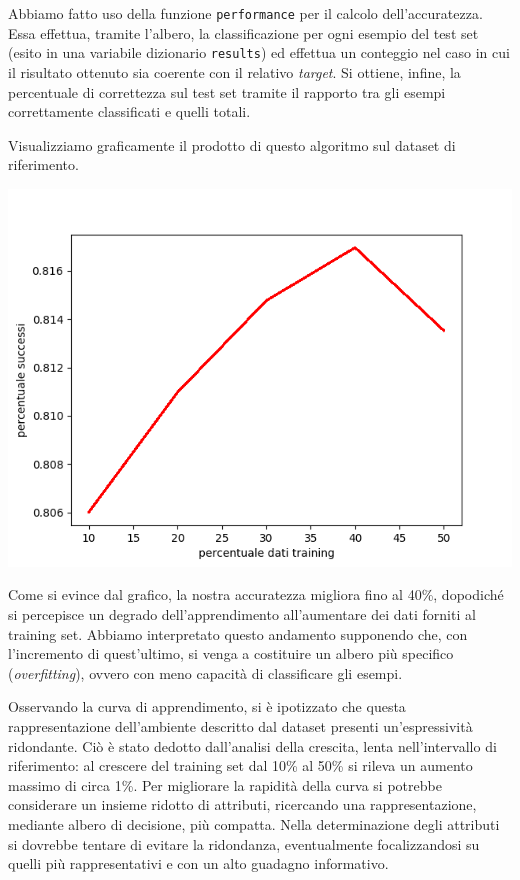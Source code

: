 			Abbiamo fatto uso della funzione \texttt{performance} per il calcolo dell'accuratezza. Essa effettua, tramite l'albero, la classificazione per ogni esempio del test set (esito in una variabile dizionario \texttt{results}) ed effettua un conteggio nel caso in cui il risultato ottenuto sia coerente con il relativo \emph{target}. Si ottiene, infine, la percentuale di correttezza sul test set tramite il rapporto tra gli esempi correttamente classificati e quelli totali.\par
			Visualizziamo graficamente il prodotto di questo algoritmo sul dataset di riferimento.
			
			\includegraphics[scale=0.86]{performance.png}
			 
			Come si evince dal grafico, la nostra accuratezza migliora fino al 40\%, dopodiché si percepisce un degrado dell'apprendimento all'aumentare dei dati forniti al training set. Abbiamo interpretato questo andamento supponendo che, con l'incremento di quest'ultimo, si venga a costituire un albero più specifico (\emph{overfitting}), ovvero con meno capacità di classificare gli esempi.\par
			Osservando la curva di apprendimento, si è ipotizzato che questa rappresentazione dell'ambiente descritto dal dataset presenti un'espressività ridondante. Ciò è stato dedotto dall'analisi della crescita, lenta nell'intervallo di riferimento: al crescere del training set dal 10\% al 50\% si rileva un aumento massimo di circa 1\%. Per migliorare la rapidità della curva si potrebbe considerare un insieme ridotto di attributi, ricercando una rappresentazione, mediante albero di decisione, più compatta. Nella determinazione degli attributi si  dovrebbe tentare di evitare la ridondanza, eventualmente focalizzandosi su quelli più rappresentativi e con un alto guadagno informativo.
